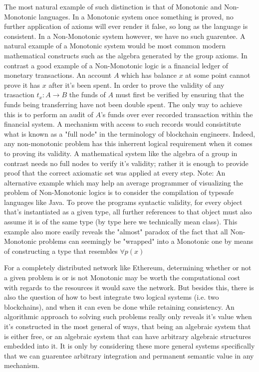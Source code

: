 \documentclass[12pt]{amsart}
\begin{document}
 The most natural example of such distinction is that of Monotonic and Non-Monotonic languages. In a Monotonic system once something is proved, no further application of axioms will ever render it false, so long as the language is consistent. In a Non-Monotonic system however, we have no such guarentee. A natural example of a Monotonic system would be most common modern mathematical constructs such as the algebra generated by the group axioms. In contrast a good example of a Non-Monotonic logic is a financial ledger of monetary transactions. An account $A$ which has balance $x$ at some point cannot prove it has $x$ after it's been spent. In order to prove the validity of any trasaction $t_x:A\rightarrow B$ the funds of $A$ must first be verified by ensuring that the funds being transferring have not been double spent. The only way to achieve this is to perform an audit of $A$'s funds over ever recorded transaction within the financial system. A mechanism with access to such records would consistitute what is known as a "full node" in the terminology of blockchain engineers. Indeed, any non-monotonic problem has this inherrent logical requirement when it comes to proving its validity. A mathematical system like the algebra of a group in contrast needs no full nodes to verify it's validity; rather it is enough to provide proof that the correct axiomatic set was applied at every step.
 Note: An alternative example which may help an average programmer of visualizing the problem of Non-Monotonic logics is to consider the compilation of typesafe languages like Java. To prove the programs syntactic validity, for every object that's instantiated as a given type, all further references to that object must also assume it is of the same type (by type here we technically mean class). This example also more easily reveals the "almost" paradox of the fact that all Non-Monotonic problems can seemingly be "wrapped" into a Monotonic one by means of constructing a type that resembles $\forall p(x)$

For a completely distributed network like Ethereum, determining whether or not a given problem is or is not Monotonic may be worth the computational cost with regards to the resources it would save the network. But besides this, there is also the question of how to best integrate two logical systems (i.e. two blockchains), and when it can even be done while retaining consistency. An algorithmic approach to solving such problems really only reveals it's value when it's constructed in the most general of ways, that being an algebraic system that is either free, or an algebraic system that can have arbitrary algebraic structures embedded into it. It is only by considering these more general systems specifically that we can guarentee arbitrary integration and permanent semantic value in any mechanism.
\end{document}
